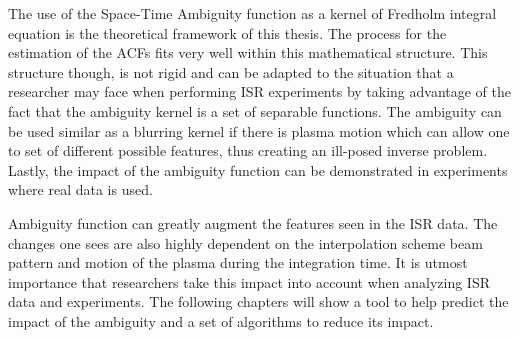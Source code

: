 The use of the Space-Time Ambiguity function as a kernel of Fredholm integral equation is the theoretical framework of this thesis. The process for the estimation of the ACFs fits very well within this mathematical structure. This structure though, is not rigid and can be adapted to the situation that a researcher may face when performing ISR experiments by taking advantage of the fact that the ambiguity kernel is a set of separable functions. The ambiguity can be used similar as a blurring kernel if there is plasma motion which can allow one to set of different possible features, thus creating an ill-posed inverse problem. Lastly, the impact of the ambiguity function can be demonstrated in experiments where real data is used.

Ambiguity function can greatly augment the features seen in the ISR data. The changes one sees are also highly dependent on the interpolation scheme beam pattern and motion of the plasma during the integration time. It is utmost importance that researchers take this impact into account when analyzing ISR data and experiments. The following chapters will show a tool to help predict the impact of the ambiguity and a set of algorithms to reduce its impact.